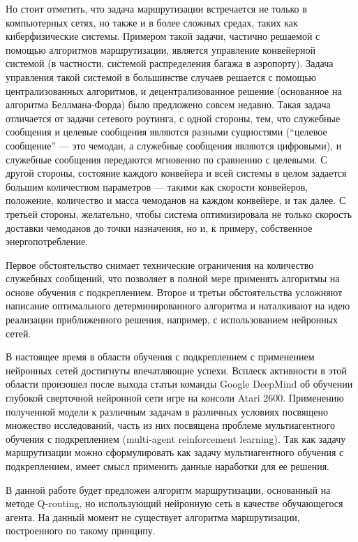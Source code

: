 \documentclass[specification, annotation]{itmo-student-thesis}
\begin{document}
Но стоит отметить, что задача маршрутизации встречается не только в компьютерных сетях, но
также и в более сложных средах, таких как киберфизические системы. Примером такой
задачи, частично решаемой с помощью алгоритмов маршрутизации, является
управление конвейерной системой (в частности, системой распределения багажа в
аэропорту). Задача управления такой системой в большинстве случаев решается с
помощью централизованных алгоритмов, и децентрализованное решение (основанное на
алгоритма Беллмана-Форда) было предложено совсем недавно\cite{vyatkin-controllers}. 
Такая задача отличается от задачи сетевого роутинга, с одной
стороны, тем, что служебные сообщения и целевые сообщения являются разными
сущностями (``целевое сообщение'' --- это чемодан, а служебные сообщения являются
цифровыми), и служебные сообщения передаются мгновенно по сравнению с целевыми.
С другой стороны, состояние каждого конвейера и всей системы в целом задается
большим количеством параметров --- такими как скорости конвейеров, положение,
количество и масса чемоданов на каждом конвейере, и так далее. С третьей
стороны, желательно, чтобы система оптимизировала не только скорость доставки
чемоданов до точки назначения, но и, к примеру, собственное энергопотребление.

Первое обстоятельство снимает технические ограничения на количество служебных
сообщений, что позволяет в полной мере применять алгоритмы на основе обучения с
подкреплением. Второе и третьи обстоятельства усложняют написание оптимального
детерминированного алгоритма и наталкивают на идею реализации приближенного
решения, например, с использованием нейронных сетей.

В настоящее время в области обучения с подкреплением с применением нейронных
сетей достигнуты впечатляющие успехи. Всплеск активности в этой области
произошел после выхода статьи команды Google DeepMind об обучении глубокой
сверточной нейронной сети игре на консоли Atari 2600\cite{deepmind-dqn-orig}.
Применению полученной модели к различным задачам в различных условиях посвящено
множество исследований, часть из них посвящена проблеме мультиагентного обучения
с подкреплением (multi-agent reinforcement learning). Так как задачу
маршрутизации можно сформулировать как задачу мультиагентного обучения с
подкреплением, имеет смысл применить данные наработки для ее решения.

В данной работе будет предложен алгоритм маршрутизации, основанный на методе
Q-routing, но использующий нейронную сеть в качестве обучающегося агента.
На данный момент не существует алгоритма маршрутизации, построенного по такому
принципу.
\end{document}

